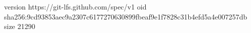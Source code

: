 version https://git-lfs.github.com/spec/v1
oid sha256:9cd93853aec9a2307c6177270630899fbeaf9e1f7828c31b4efd5a4e007257db
size 21290

